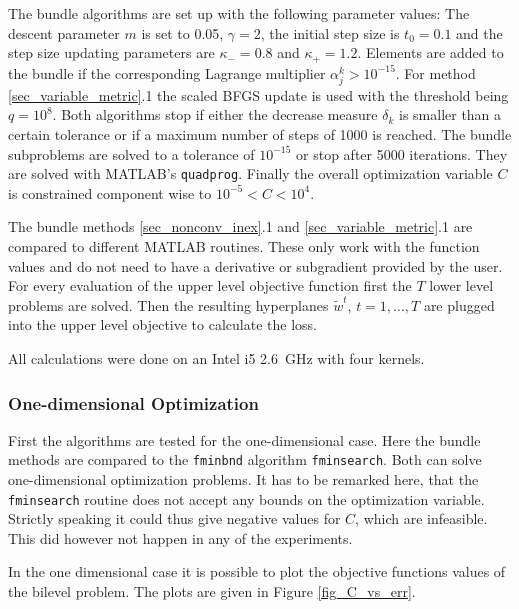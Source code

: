 The bundle algorithms are set up with the following parameter values: The descent parameter \(m\) is set to 0.05, \(\gamma = 2\), the initial step size is \(t_0 = 0.1\) and the step size updating parameters are \(\kappa_{-} = 0.8\) and \(\kappa_{+}=1.2\).
Elements are added to the bundle if the corresponding Lagrange multiplier \(\alpha^k_j > 10^{-15}\).
For method \ref{sec_variable_metric}.1 the scaled BFGS update is used with the threshold being \(q=10^8\).
Both algorithms stop if either the decrease measure \(\delta_k\) is smaller than a certain tolerance or if a maximum number of steps of 1000 is reached. The bundle subproblems are solved to a tolerance of \(10^{-15}\) or stop after 5000 iterations. They are solved with MATLAB's \texttt{quadprog}.
Finally the overall optimization variable \(C\) is constrained component wise to \(10^{-5} < C < 10^4\).


The bundle methods \ref{sec_nonconv_inex}.1 and \ref{sec_variable_metric}.1 are compared to different MATLAB routines.
These only work with the function values and do not need to have a derivative or subgradient provided by the user.
For every evaluation of the upper level objective function first the \(T\) lower level problems are solved. Then the resulting hyperplanes \(\tilde{w}^t\), \(t=1,...,T\) are plugged into the upper level objective to calculate the loss.

All calculations were done on an Intel i5 2.6~GHz with four kernels.


\subsubsection{One-dimensional Optimization}

First the algorithms are tested for the one-dimensional case.
Here the bundle methods are compared to the \texttt{fminbnd} algorithm \texttt{fminsearch}. Both can solve one-dimensional optimization problems.
It has to be remarked here, that the \texttt{fminsearch} routine does not accept any bounds on the optimization variable. Strictly speaking it could thus give negative values for \(C\), which are infeasible. This did however not happen in any of the experiments.

In the one dimensional case it is possible to plot the objective functions values of the bilevel problem. The plots are given in Figure \ref{fig_C_vs_err}.


